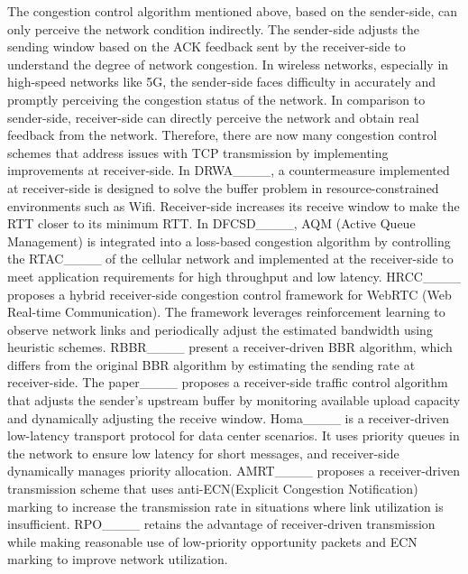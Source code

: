 The congestion control algorithm mentioned above, based on the sender-side, can only perceive the network condition indirectly. The sender-side adjusts the sending window based on the ACK feedback sent by the receiver-side to understand the degree of network congestion. In wireless networks, especially in high-speed networks like 5G, the sender-side faces difficulty in accurately and promptly perceiving the congestion status of the network. In comparison to sender-side, receiver-side can directly perceive the network and obtain real feedback from the network. Therefore, there are now many congestion control schemes that address issues with TCP transmission by implementing improvements at receiver-side. In DRWA____, a countermeasure implemented at receiver-side is designed to solve the buffer problem in resource-constrained environments such as Wifi. Receiver-side increases its receive window to make the RTT closer to its minimum RTT. In DFCSD____, AQM (Active Queue Management) is integrated into a loss-based congestion algorithm by controlling the RTAC____ of the cellular network and implemented at the receiver-side to meet application requirements for high throughput and low latency. HRCC____ proposes a hybrid receiver-side congestion control framework for WebRTC (Web Real-time Communication). The framework leverages reinforcement learning to observe network links and periodically adjust the estimated bandwidth using heuristic schemes. RBBR____ present a receiver-driven BBR algorithm, which differs from the original BBR algorithm by estimating the sending rate at receiver-side. The paper____ proposes a receiver-side traffic control algorithm that adjusts the sender's upstream buffer by monitoring available upload capacity and dynamically adjusting the receive window. Homa____ is a receiver-driven low-latency transport protocol for data center scenarios. It uses priority queues in the network to ensure low latency for short messages, and receiver-side dynamically manages priority allocation. AMRT____ proposes a receiver-driven transmission scheme that uses anti-ECN(Explicit Congestion Notification) marking to increase the transmission rate in situations where link utilization is insufficient. RPO____ retains the advantage of receiver-driven transmission while making reasonable use of low-priority opportunity packets and ECN marking to improve network utilization.

